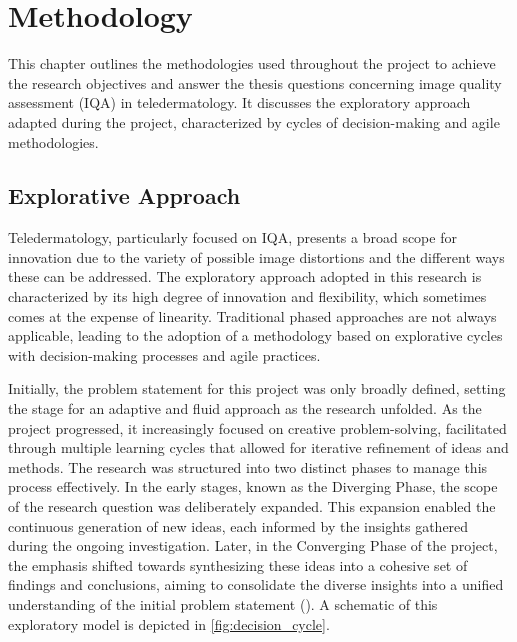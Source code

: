 \chapter{Methodology}
\label{ch:Methodology}
This chapter outlines the methodologies used throughout the project to achieve the research objectives and answer the thesis questions concerning image quality assessment (IQA) in teledermatology. It discusses the exploratory approach adapted during the project, characterized by cycles of decision-making and agile methodologies.\par

\section{Explorative Approach}
\label{sec:ExplorativeApproach}
Teledermatology, particularly focused on IQA, presents a broad scope for innovation due to the variety of possible image distortions and the different ways these can be addressed. The exploratory approach adopted in this research is characterized by its high degree of innovation and flexibility, which sometimes comes at the expense of linearity. Traditional phased approaches are not always applicable, leading to the adoption of a methodology based on explorative cycles with decision-making processes and agile practices. \par
\vspace{\baselineskip}
\noindent
Initially, the problem statement for this project was only broadly defined, setting the stage for an adaptive and fluid approach as the research unfolded. As the project progressed, it increasingly focused on creative problem-solving, facilitated through multiple learning cycles that allowed for iterative refinement of ideas and methods. The research was structured into two distinct phases to manage this process effectively. In the early stages, known as the Diverging Phase, the scope of the research question was deliberately expanded. This expansion enabled the continuous generation of new ideas, each informed by the insights gathered during the ongoing investigation. Later, in the Converging Phase of the project, the emphasis shifted towards synthesizing these ideas into a cohesive set of findings and conclusions, aiming to consolidate the diverse insights into a unified understanding of the initial problem statement (\cite{DesignThinking}). A schematic of this exploratory model is depicted in  \autoref{fig:decision_cycle}.\par
